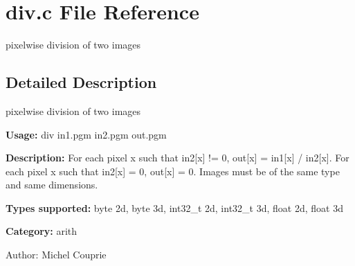 \section{div.c File Reference}
\label{div_8c}
pixelwise division of two images 



\subsection{Detailed Description}
pixelwise division of two images 

{\bf Usage:} div in1.pgm in2.pgm out.pgm

{\bf Description:} For each pixel x such that in2[x] != 0, out[x] = in1[x] / in2[x]. For each pixel x such that in2[x] = 0, out[x] = 0. Images must be of the same type and same dimensions.

{\bf Types supported:} byte 2d, byte 3d, int32\_\-t 2d, int32\_\-t 3d, float 2d, float 3d

{\bf Category:} arith

\begin{Desc}
\item[Author:]Michel Couprie \end{Desc}

